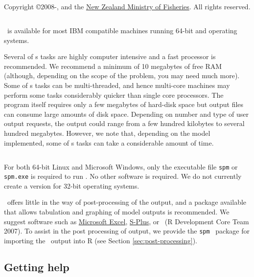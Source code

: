 Copyright \copyright 2008-\SourceControlYearDoc, \href{http://www.niwa.co.nz}{\Organisation} and the \href{http://www.fish.govt.nz}{New Zealand Ministry of Fisheries}. All rights reserved.

\subsection{}

\SPM\ is available for most IBM compatible machines running 64-bit  and  operating systems.

Several of \SPM s tasks are highly computer intensive and a fast processor is recommended. We recommend a minimum of 10 megabytes of free RAM (although, depending on the scope of the problem, you may need much more). Some of \SPM s tasks can be multi-threaded, and hence multi-core machines may perform some tasks considerably quicker than single core processors. The program itself requires only a few megabytes of hard-disk space but output files can consume large amounts of disk space. Depending on number and type of user output requests, the output could range from a few hundred kilobytes to several hundred megabytes. However, we note that, depending on the model implemented, some of \SPM s tasks can take a considerable amount of time.

\subsection{}

For both 64-bit Linux and Microsoft Windows, only the executable file \texttt{spm} or \texttt{spm.exe} is required to run \SPM . No other software is required. We do not currently create a version for 32-bit operating systems. 

\SPM\ offers little in the way of  post-processing of the output, and a package available that allows tabulation and graphing of model outputs is recommended. We suggest software such as \href{http://www.microsoft.com}{Microsoft Excel}, \href{http://www.insightful.com}{S-Plus}, or \href{http://www.r-project.org}{\R}\ (R Development Core Team 2007). To assist in the post processing of \SPM output, we provide the \texttt{spm} \R\ package for importing the \SPM\ output into R (see Section \ref{sec:post-processing}).

\subsection{Getting help}


